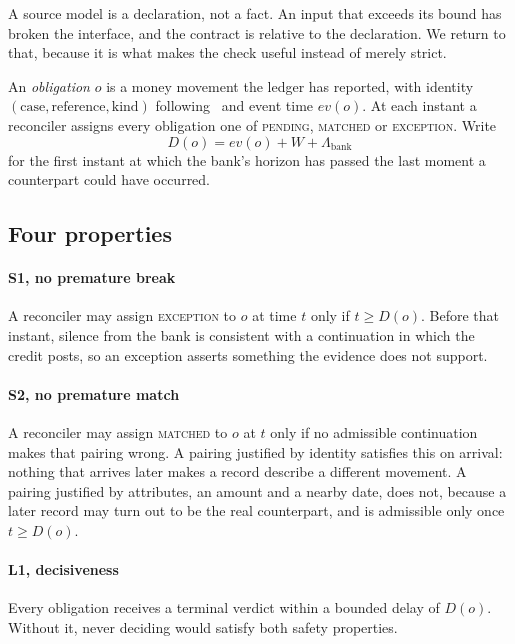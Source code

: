 \documentclass[10pt,conference]{IEEEtran}
\begin{document}
A source model is a declaration, not a fact. An input that exceeds its bound has
broken the interface, and the contract is relative to the declaration. We return to that, because it
is what makes the check useful instead of merely strict.

An \emph{obligation} $o$ is a money movement the ledger has reported, with
identity $(\text{case}, \text{reference}, \text{kind})$ following~\cite{t8} and
event time $\mathit{ev}(o)$. At each instant a reconciler assigns every
obligation one of \textsc{pending}, \textsc{matched} or \textsc{exception}. Write
\begin{equation}
D(o) = \mathit{ev}(o) + W + \Lambda_{\mathrm{bank}}
\label{eq:decidable}
\end{equation}
for the first instant at which the bank's horizon has passed the last moment a
counterpart could have occurred.

\subsection{Four properties}

\paragraph{S1, no premature break} A reconciler may assign \textsc{exception} to
$o$ at time $t$ only if $t \ge D(o)$. Before that instant, silence from the bank
is consistent with a continuation in which the credit posts, so an exception
asserts something the evidence does not support.

\paragraph{S2, no premature match} A reconciler may assign \textsc{matched} to
$o$ at $t$ only if no admissible continuation makes that pairing wrong. A
pairing justified by identity satisfies this on arrival: nothing that arrives
later makes a record describe a different movement. A pairing justified by attributes, an amount and a nearby date, does not, because a later record
may turn out to be the real counterpart, and is admissible only once $t \ge
D(o)$.

\paragraph{L1, decisiveness} Every obligation receives a terminal verdict within
a bounded delay of $D(o)$. Without it, never deciding would satisfy both safety
properties.
\end{document}
